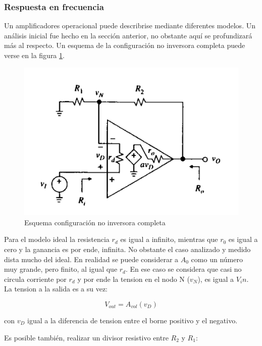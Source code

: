 \subsubsection{Respuesta en frecuencia}

Un amplificadores operacional puede describrise mediante diferentes modelos. Un análisis inicial fue hecho en la sección anterior, no obstante aquí se profundizará más al respecto. Un esquema de la configuración no inversora completa puede verse en la figura \ref{fig:esquema_no_inversor}. 

\begin{figure}[H]	
	\centering
	\includegraphics[width=\textwidth]{Ejercicio2/Imagenes/Rin_no_inversor.png}
	\caption{Esquema configuración no inversora completa}
	\label{fig:esquema_no_inversor}
\end{figure}

Para el modelo ideal la resistencia $r_d$ es igual a infinito, mientras que $r_0$ es igual a cero y la ganancia es por ende, infinita. No obstante el caso analizado y medido dista mucho del ideal. En realidad se puede considerar a $A_0$ como un número muy grande, pero finito, al igual que $r_d$. En ese caso se considera que casi no circula corriente por $r_d$ y por ende la tension en el nodo N ($v_N$), es igual a $V_in$. La tension a la salida es a su vez:

\begin{equation}\label{eq:ganancia}
V_{out} = A_{vol}(v_D)
\end{equation}

con $v_D$ igual a la diferencia de tension entre el borne positivo y el negativo. 

Es posible también, realizar un divisor resistivo entre $R_2$ y $R_1$:

